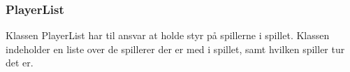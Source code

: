 \subsubsection{PlayerList}
Klassen PlayerList har til ansvar at holde styr på spillerne i spillet. Klassen indeholder en liste over de spillerer der er med i spillet, samt hvilken spiller tur det er.